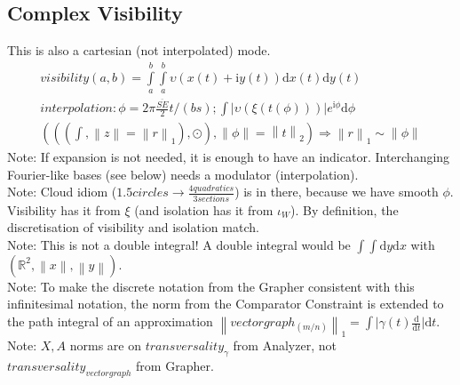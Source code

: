 \documentclass{report}
\newcommand\norm[1]{\left\lVert#1\right\rVert}
\begin{document}
\subsection{Complex Visibility}
This is also a cartesian (not interpolated) mode.
\begin{align}
visibility(a,b)=\int \limits _{a}^{b} \int \limits _{a}^{b} \upsilon (x(t)+\mathrm{i}y(t)) \mathrm{d}x(t)\mathrm{d}y(t)\\
interpolation: \phi = 2\pi\frac{\overline{SE}}{2}t/(bs); \int \lvert \upsilon (\xi (t(\phi)))\rvert e^{\mathrm{i}\phi}\mathrm{d}\phi\\
(((\int,\norm{z}=\norm{r}_1),\odot),\norm{\phi}= \norm{t}_2)\Rightarrow \norm{r}_1 \sim \norm{\phi}
\end{align}
Note: If expansion is not needed, it is enough to have an indicator. Interchanging Fourier-like bases (see below) needs a modulator (interpolation).\\
Note: Cloud idiom ($1.5 circles \rightarrow \frac{4 quadratics}{3 sections}$) is in there, because we have smooth $\phi$. Visibility has it from $\xi$ (and isolation has it from $\iota_{W}$). By definition, the discretisation of visibility and isolation match.\\
Note: This is not a double integral! A double integral would be $\int \int \mathrm{d}y\mathrm{d}x$ with $(\mathbb{R}^2,\norm{x},\norm{y})$.\\
Note: To make the discrete notation from the Grapher consistent with this infinitesimal notation, the norm from the Comparator Constraint is extended to the path integral of an approximation $\norm{vectorgraph_{(m/n)}}_1=\int \lvert \gamma (t) \frac{\mathrm{d}}{\mathrm{d}t} \rvert \mathrm{d}t$.
Note: $X,A$ norms are on $transversality_{\gamma}$ from Analyzer, not $transversality_{vectorgraph}$ from Grapher.
\end{document}

